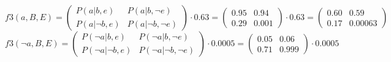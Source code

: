 \documentclass[11pt]{article}
\begin{document}
$$
  f3(a,B,E) = 
\begin{pmatrix}
  P(a|b,e) & P(a|b,\neg e) \\
  P(a|\neg b,e) & P(a|\neg b,\neg e)
\end{pmatrix} \cdot 0.63
=
\begin{pmatrix}
  0.95 & 0.94 \\
  0.29 & 0.001
\end{pmatrix} \cdot 0.63
= 
\begin{pmatrix}
  0.60 & 0.59 \\
  0.17 & 0.00063
\end{pmatrix} 
$$
$$
  f3(\neg a,B,E) = 
\begin{pmatrix}
  P(\neg a|b,e) & P(\neg a|b,\neg e) \\
  P(\neg a|\neg b,e) & P(\neg a|\neg b,\neg e)
\end{pmatrix} \cdot 0.0005
=
\begin{pmatrix}
  0.05 & 0.06 \\
  0.71 & 0.999
\end{pmatrix} \cdot 0.0005
$$
\end{document}
